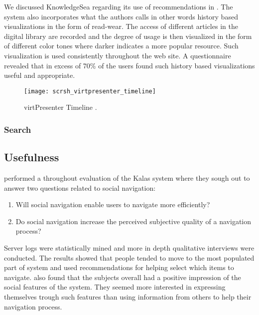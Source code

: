 We discussed KnowledgeSea regarding its use of recommendations in
.
The system also incorporates what the authors calls
\citep[]{brusilovsky05}\dash{}in other words history based
visualizations in the form of read-wear. The access of different articles in
the digital library are recorded and the degree of usage is then visualized in
the form of different color tones where darker indicates a more popular
resource. Such visualization is used consistently throughout the web site. A
questionnaire revealed that in excess of 70\%
\citeyearpar[p.15]{brusilovsky05} of the users
found such history based visualizations useful and appropriate.

\begin{figure}
  \centering
  \texttt{[image: scrsh\_virtpresenter\_timeline]}
  \caption[virtPresenter Timeline]{
    virtPresenter Timeline \citep[]{mertens06}.
  }
  \label{figure:scrsh.virtpresenter.timeline}
\end{figure}


\subsubsection{Search}
%
%


\subsection{Usefulness}

\citet{svensson05} performed a throughout evaluation of the Kalas system where
they sough out to answer two questions related to social navigation:

\begin{enumerate}
  \item Will social navigation enable users to navigate more efficiently?
  \item Do social navigation increase the perceived subjective quality of
    a navigation process?
\end{enumerate}

Server logs were statistically mined and more in depth qualitative interviews
were conducted. The results showed that people tended to move to the most
populated part of system and used recommendations for helping select which
items to navigate. \citeauthor{svensson05} also found that the subjects
overall had a positive impression of the social features of the system. They
seemed more interested in expressing themselves trough such features than
using information from others to help their navigation process.

